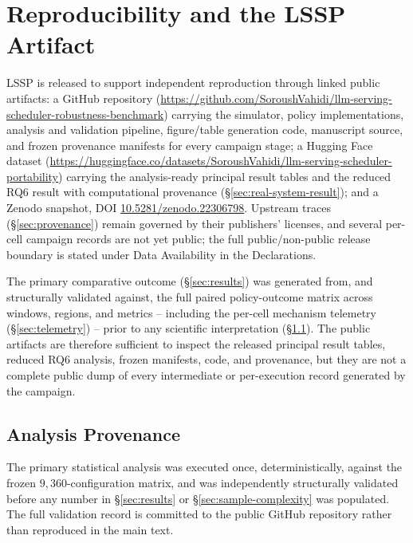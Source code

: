 \section{Reproducibility and the LSSP Artifact}
\label{sec:artifact}

LSSP is released to support independent reproduction through linked
public artifacts: a GitHub repository
(\url{https://github.com/SoroushVahidi/llm-serving-scheduler-robustness-benchmark})
carrying the simulator, policy implementations, analysis and validation
pipeline, figure/table generation code, manuscript source, and frozen
provenance manifests for every campaign stage; a Hugging Face dataset
(\url{https://huggingface.co/datasets/SoroushVahidi/llm-serving-scheduler-portability})
carrying the analysis-ready principal result tables and the reduced RQ6
result with computational provenance (\S\ref{sec:real-system-result}); and a
Zenodo snapshot, DOI
\href{https://doi.org/10.5281/zenodo.22306798}{10.5281/zenodo.22306798}.
Upstream traces (\S\ref{sec:provenance}) remain governed by their
publishers' licenses, and several per-cell campaign records are not yet
public; the full public/non-public release boundary is stated under Data
Availability in the Declarations.

The primary comparative outcome (\S\ref{sec:results}) was generated from,
and structurally validated against, the full paired policy-outcome matrix
across windows, regions, and metrics -- including the per-cell mechanism
telemetry (\S\ref{sec:telemetry}) -- prior to any scientific
interpretation (\S\ref{sec:artifact-hashes}). The public artifacts are
therefore sufficient to inspect the released principal result tables, reduced
RQ6 analysis, frozen manifests, code, and provenance, but they are not a
complete public dump of every intermediate or per-execution record generated
by the campaign.

\subsection{Analysis Provenance}
\label{sec:artifact-hashes}

The primary statistical analysis was executed once, deterministically,
against the frozen $9{,}360$-configuration matrix, and was independently
structurally validated before any number in \S\ref{sec:results} or
\S\ref{sec:sample-complexity} was populated. The full validation record is
committed to the public GitHub repository rather than reproduced in the
main text.

